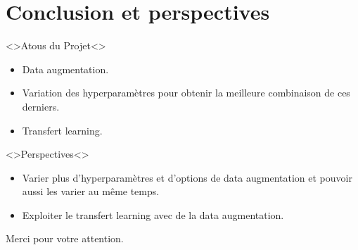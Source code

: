 \documentclass[10pt,handout]{beamer}
\begin{document}
\section{Conclusion et perspectives}

\begin{frame}{}
    \begin{block}<>{Atous du Projet}<>
        \begin{itemize}
            \item Data augmentation.
            \item Variation des hyperparamètres pour obtenir la meilleure combinaison de ces derniers.
            \item Transfert learning.
        \end{itemize}
    \end{block}
    \begin{block}<>{Perspectives}<>
        \begin{itemize}
            \item Varier plus d’hyperparamètres et d’options de data augmentation et pouvoir aussi les varier au
            même temps.
            \item Exploiter le transfert learning avec de la data augmentation.
        \end{itemize}
    \end{block}
\end{frame}


\begin{frame}{}
    \begin{center}
      Merci pour votre attention.
    \end{center}
\end{frame}
  
\end{document}
